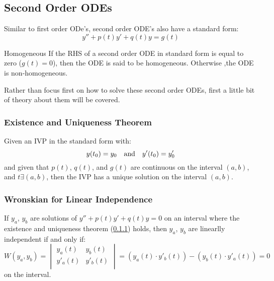 \documentclass[12pt]{article}
\begin{document}
\subsection{Second Order ODEs}
\label{ssec:secondOrderODEs}

Similar to first order ODe's, second order ODE's also have a standard form:
\begin{equation*}
  y'' + p(t)y' + q(t)y = g(t)
\end{equation*}

\begin{definition}{Homogeneous}
  If the RHS of a second order ODE in standard form is equal to zero ($g(t) = 0$), then the  ODE is said to be homogeneous. Otherwise ,the ODE is non-homogeneous.
\end{definition}

Rather than focus first on how to solve these second order ODEs, first a little bit of theory about them will be covered.

\subsubsection{Existence and Uniqueness Theorem}
\label{sssec:existenceAndUniquenessTheorem}

Given an IVP in the standard form with:
\begin{equation*}
  y(t_0) = y_0\ \ \ \textup{and}\ \ \ y'(t_0) = y'_0
\end{equation*}
and given that $p(t)$, $q(t)$, and $g(t)$ are continuous on the interval $(a,b)$, and $t \exists (a,b)$, then the IVP has a unique solution on the interval $(a,b)$.

\subsubsection{Wronskian for Linear Independence}
\label{sssec:wronskianForLinearIndependence}

If $y_a$, $y_b$ are solutions of $y'' + p(t)y' + q(t)y = 0$ on an interval where the existence and uniqueness theorem (\ref{sssec:existenceAndUniquenessTheorem}) holds, then $y_a$, $y_b$ are linearlly independent if and only if:
\begin{equation*}
  W(y_a,y_b) = 
  \begin{vmatrix}
    y_a(t)  & y_b(t) \\
    y'_a(t) & y'_b(t) \\
  \end{vmatrix} = 
    \left( y_a(t) \cdot y'_b(t) \right) - \left( y_b(t) \cdot y'_a(t) \right) = 0
\end{equation*}
on the interval.
\end{document}

